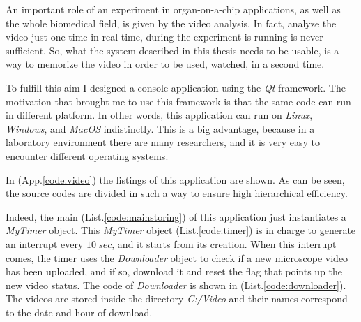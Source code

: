 An important role of an experiment in organ-on-a-chip applications, as well as the whole biomedical field, is given by the video analysis. In fact, analyze the video just one time in real-time, during the experiment is running is never sufficient. So, what the system described in this thesis needs to be usable, is a way to memorize the video in order to be used, watched, in a second time.

To fulfill this aim I designed a console application using the \textit{Qt} framework. The motivation that brought me to use this framework is that the same code can run in different platform. In other words, this application can run on \textit{Linux}, \textit{Windows}, and \textit{MacOS}  indistinctly. This is a big advantage, because in a laboratory environment there are many researchers, and it is very easy to encounter different operating systems.

 In (App.\ref{code:video}) the listings of this application are shown. As can be seen, the source codes are divided in such a way to ensure high hierarchical efficiency.
 
 Indeed, the main (List.\ref{code:mainstoring}) of this application just instantiates a \textit{MyTimer} object. This \textit{MyTimer} object (List.\ref{code:timer}) is in charge to generate an interrupt every $10\ sec$, and it starts from its creation. When this interrupt comes, the timer uses the \textit{Downloader} object to check if  a new microscope video has been uploaded, and if so, download it and reset the flag that points up the new video status. The code of \textit{Downloader} is shown in (List.\ref{code:downloader}). The videos are stored inside the directory \textit{C:/Video} and their names correspond to the date and hour of download. 